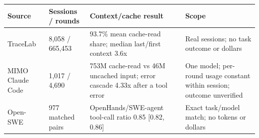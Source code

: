 \begin{tabular}{lp{3cm}p{5cm}p{4cm}}
\toprule
Source & Sessions / rounds & Context/cache result & Scope \\
\midrule
TraceLab & 8,058 / 665,453 & 93.7\% mean cache-read share; median last/first context 3.6x & Real sessions; no task outcome or dollars \\
MIMO Claude Code & 1,017 / 4,690 & 753M cache-read vs 46M uncached input; error cascade 4.33x after a tool error & One model; per-round usage constant within session; outcome unverified \\
Open-SWE & 977 matched pairs & OpenHands/SWE-agent tool-call ratio 0.85 [0.82, 0.86] & Exact task/model match; no tokens or dollars \\
\bottomrule
\end{tabular}
